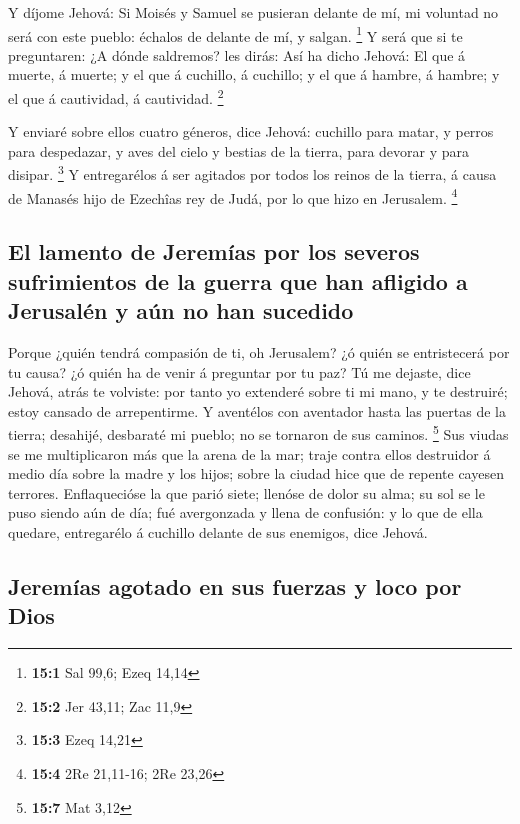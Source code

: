  Y díjome Jehová: Si Moisés y Samuel se pusieran delante
de mí, mi voluntad no será con este pueblo: échalos de delante de mí, y
salgan. \footnote{\textbf{15:1} Sal 99,6; Ezeq 14,14}  Y
será que si te preguntaren: ¿A dónde saldremos? les dirás: Así ha dicho
Jehová: El que á muerte, á muerte; y el que á cuchillo, á cuchillo; y el
que á hambre, á hambre; y el que á cautividad, á cautividad. \footnote{\textbf{15:2}
  Jer 43,11; Zac 11,9}

 Y enviaré sobre ellos cuatro géneros, dice Jehová:
cuchillo para matar, y perros para despedazar, y aves del cielo y
bestias de la tierra, para devorar y para disipar. \footnote{\textbf{15:3}
  Ezeq 14,21}  Y entregarélos á ser agitados por todos los
reinos de la tierra, á causa de Manasés hijo de Ezechîas rey de Judá,
por lo que hizo en Jerusalem. \footnote{\textbf{15:4} 2Re 21,11-16; 2Re
  23,26}

\hypertarget{el-lamento-de-jeremuxedas-por-los-severos-sufrimientos-de-la-guerra-que-han-afligido-a-jerusaluxe9n-y-auxfan-no-han-sucedido}{%
\subsection{El lamento de Jeremías por los severos sufrimientos de la
guerra que han afligido a Jerusalén y aún no han
sucedido}\label{el-lamento-de-jeremuxedas-por-los-severos-sufrimientos-de-la-guerra-que-han-afligido-a-jerusaluxe9n-y-auxfan-no-han-sucedido}}

 Porque ¿quién tendrá compasión de ti, oh Jerusalem? ¿ó
quién se entristecerá por tu causa? ¿ó quién ha de venir á preguntar por
tu paz?  Tú me dejaste, dice Jehová, atrás te volviste:
por tanto yo extenderé sobre ti mi mano, y te destruiré; estoy cansado
de arrepentirme.  Y aventélos con aventador hasta las
puertas de la tierra; desahijé, desbaraté mi pueblo; no se tornaron de
sus caminos. \footnote{\textbf{15:7} Mat 3,12}  Sus viudas
se me multiplicaron más que la arena de la mar; traje contra ellos
destruidor á medio día sobre la madre y los hijos; sobre la ciudad hice
que de repente cayesen terrores.  Enflaquecióse la que
parió siete; llenóse de dolor su alma; su sol se le puso siendo aún de
día; fué avergonzada y llena de confusión: y lo que de ella quedare,
entregarélo á cuchillo delante de sus enemigos, dice Jehová.

\hypertarget{jeremuxedas-agotado-en-sus-fuerzas-y-loco-por-dios}{%
\subsection{Jeremías agotado en sus fuerzas y loco por
Dios}\label{jeremuxedas-agotado-en-sus-fuerzas-y-loco-por-dios}}

